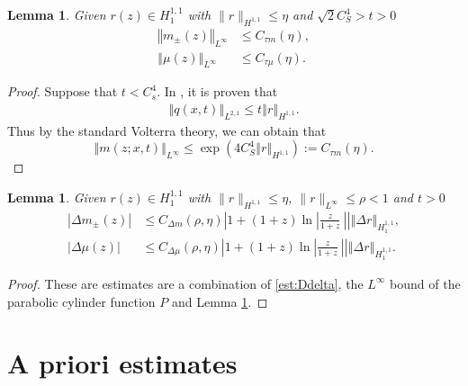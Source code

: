 \documentclass{amsart}
\theoremstyle{plain}
\newtheorem{lemma}[theorem]{Lemma}
\theoremstyle{remark}
\numberwithin{equation}{section}
\newcommand{\Red}[1]{{\color{red} #1}}
\newcommand{\norm}[2]{\left\Vert #1\right\Vert_{#2}}
\begin{document}
\begin{lemma}
\label{lm:mbound2}
   Given $r(z)\in H^{1,1}_1$ with $\|r\|_{H^{1,1}} \leqslant \eta$ and $\sqrt{2}C_S^4>t>0$
    \begin{align}
        \norm{m_\pm(z)}{L^\infty}&\leq C_{\tau m}(\eta), \\
        \norm{\mu(z)}{L^\infty}&\leq  C_{\tau \mu}(\eta).
    \end{align}
    \end{lemma}
\begin{proof}
Suppose that $t<C_s^{4}$. In \cite{Zhou98}, it is proven that 
\begin{align}
    \norm{q(x,t)}{L^{2,1}}\leq t \norm{r}{H^{1,1}}.
\end{align}
Thus by the standard Volterra theory, we can obtain that 
\begin{equation}
    \norm {m(z;x,t)}{L^\infty} \leq \exp\left(4C_S^4 \norm{r}{H^{1,1}}\right):=C_{\tau m}(\eta).
\end{equation}
\end{proof}
\begin{lemma}
   Given $r(z)\in H^{1,1}_1$ with $\|r\|_{H^{1,1}} \leqslant \eta$, $\|r\|_{L^{\infty}} \leqslant \rho<1$ and $t>0$
    \begin{align}
        \left\vert \Delta m_\pm(z)\right\vert&\leq C_{\Delta m}(\rho,\eta) \left | 1+(1+z)\ln \left | \frac{z}{1+z}\ \right |  \right |\norm{\Delta r}{H^{1,1}_1},\\
        \left\vert\Delta \mu(z)\right\vert&\leq C_{\Delta \mu} (\rho,\eta) \left | 1+(1+z)\ln \left | \frac{z}{1+z}\ \right |  \right |\norm{\Delta r}{H^{1,1}_1}.
    \end{align}  
    
\end{lemma}
\begin{proof}
These are estimates are     a combination of \eqref{est:Ddelta}, the $L^\infty$ bound of the parabolic cylinder function $P$ and Lemma \ref{lm:mbound2}.
\end{proof}


\section{A priori estimates}
\label{sec:priori}

\end{document}

